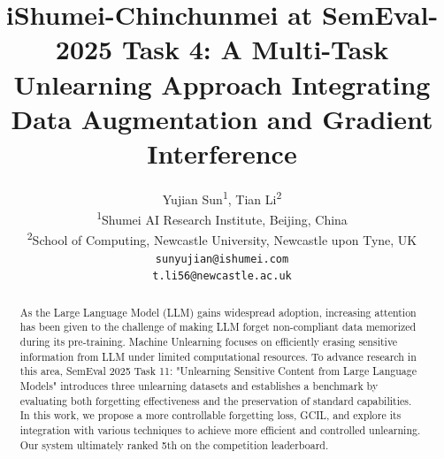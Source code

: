\documentclass[11pt]{article}
\title{iShumei-Chinchunmei at SemEval-2025 Task 4: A Multi-Task Unlearning Approach Integrating Data Augmentation and Gradient Interference}
\author{
  Yujian Sun\textsuperscript{1},
  Tian Li\textsuperscript{2}
\\
  \textsuperscript{1}Shumei AI Research Institute, Beijing, China\\
  \textsuperscript{2}School of Computing, Newcastle University, Newcastle upon Tyne, UK
\\
  \texttt{sunyujian@ishumei.com}\\
  \texttt{t.li56@newcastle.ac.uk}
}
\begin{document}
\maketitle
\begin{abstract}




As the Large Language Model (LLM) gains widespread adoption, increasing attention has been given to the challenge of making LLM forget non-compliant data memorized during its pre-training. Machine Unlearning focuses on efficiently erasing sensitive information from LLM under limited computational resources. To advance research in this area, SemEval 2025 Task 11: "Unlearning Sensitive Content from Large Language Models" introduces three unlearning datasets and establishes a benchmark by evaluating both forgetting effectiveness and the preservation of standard capabilities. In this work, we propose a more controllable forgetting loss, GCIL, and explore its integration with various techniques to achieve more efficient and controlled unlearning. Our system ultimately ranked 5th on the competition leaderboard.

\end{abstract}
\end{document}
